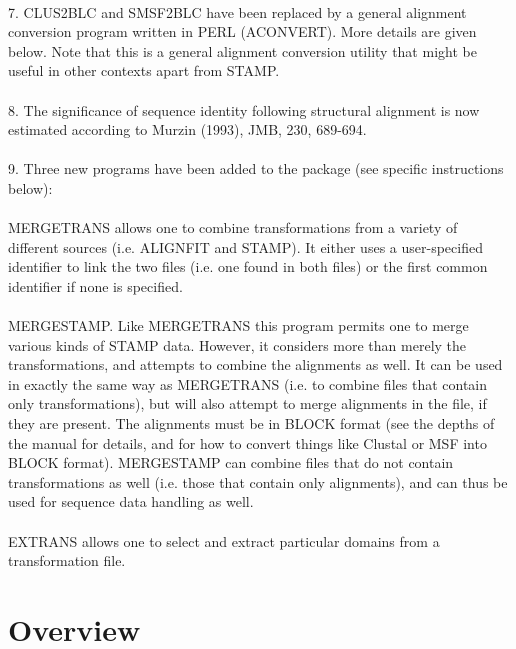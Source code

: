 \\
7. CLUS2BLC and SMSF2BLC have been replaced by a general alignment conversion program written
in PERL (ACONVERT).  More details are given below.  Note that this is a general alignment
conversion utility that might be useful in other contexts apart from STAMP.\\
\\
8. The significance of sequence identity following structural alignment is now estimated 
according to Murzin (1993), JMB, 230, 689-694.\\
\\
9. Three new programs have been added to the package (see specific instructions below):\\
\\
MERGETRANS allows one to combine transformations from a variety of different 
sources (i.e. ALIGNFIT and STAMP).  It either uses a user-specified identifier to link the 
two files (i.e. one found in both files) or the first common identifier if none is specified.\\
\\
MERGESTAMP.  Like MERGETRANS this program permits one to merge
various kinds of STAMP data.  However, it considers more than merely
the transformations, and attempts to combine the alignments as well.
It can be used in exactly the same way as MERGETRANS (i.e. to combine
files that contain only transformations), but will also attempt to merge
alignments in the file, if they are present.  The alignments must be
in BLOCK format (see the depths of the manual for details, and for how
to convert things like Clustal or MSF into BLOCK format).  MERGESTAMP
can combine files that do not contain transformations as well (i.e. those
that contain only alignments), and can thus be used for sequence data
handling as well.\\
\\
EXTRANS allows one to select and extract particular domains from a transformation file. 


\section{Overview}


